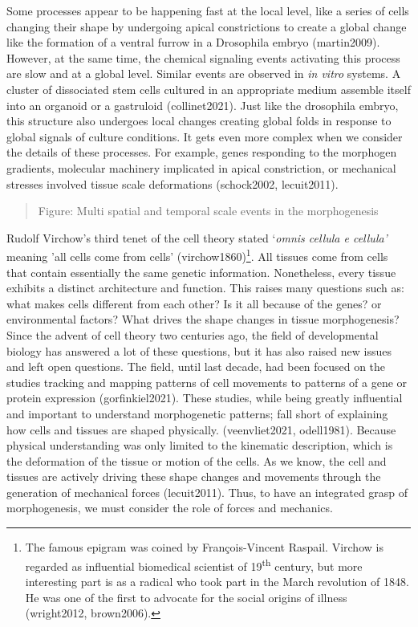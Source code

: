 \documentclass[
]{article}
\begin{document}
Some processes appear to be happening fast at the local level, like a
series of cells changing their shape by undergoing apical constrictions
to create a global change like the formation of a ventral furrow in a
Drosophila embryo (martin2009). However, at the same time, the chemical
signaling events activating this process are slow and at a global level.
Similar events are observed in \emph{in vitro} systems. A cluster of
dissociated stem cells cultured in an appropriate medium assemble itself
into an organoid or a gastruloid (collinet2021). Just like the
drosophila embryo, this structure also undergoes local changes creating
global folds in response to global signals of culture conditions. It
gets even more complex when we consider the details of these processes.
For example, genes responding to the morphogen gradients, molecular
machinery implicated in apical constriction, or mechanical stresses
involved tissue scale deformations (schock2002, lecuit2011).

\begin{quote}
Figure: Multi spatial and temporal scale events in the morphogenesis
\end{quote}

Rudolf Virchow's third tenet of the cell theory stated `\emph{omnis
cellula e cellula'} meaning 'all cells come from cells'
(virchow1860)\footnote{The famous epigram was coined by François-Vincent
  Raspail. Virchow is regarded as influential biomedical scientist of
  19\textsuperscript{th} century, but more interesting part is as a
  radical who took part in the March revolution of 1848. He was one of
  the first to advocate for the social origins of illness (wright2012,
  brown2006).}. All tissues come from cells that contain essentially the
same genetic information. Nonetheless, every tissue exhibits a distinct
architecture and function. This raises many questions such as: what
makes cells different from each other? Is it all because of the genes?
or environmental factors? What drives the shape changes in tissue
morphogenesis? Since the advent of cell theory two centuries ago, the
field of developmental biology has answered a lot of these questions,
but it has also raised new issues and left open questions. The field,
until last decade, had been focused on the studies tracking and mapping
patterns of cell movements to patterns of a gene or protein expression
(gorfinkiel2021). These studies, while being greatly influential and
important to understand morphogenetic patterns; fall short of explaining
how cells and tissues are shaped physically. (veenvliet2021, odell1981).
Because physical understanding was only limited to the kinematic
description, which is the deformation of the tissue or motion of the
cells. As we know, the cell and tissues are actively driving these shape
changes and movements through the generation of mechanical forces
(lecuit2011). Thus, to have an integrated grasp of morphogenesis, we
must consider the role of forces and mechanics.
\end{document}
